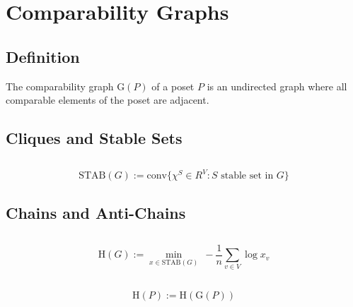 \section{Comparability Graphs}
\subsection{Definition}

The comparability graph $\text{G}(P)$ of a poset $P$ is an undirected graph where all comparable elements of the poset are adjacent.

\subsection{Cliques and Stable Sets}



\subsection{}
\begin{equation}
\text{STAB}(G) := \text{conv}\{\chi^S \in R^V : S\text{ stable set in }G\}
\label{eq:stab}
\end{equation}

\subsection{Chains and Anti-Chains}

\subsection{}
\begin{equation}
\text{H}(G) := \min_{x \in \text{STAB}(G)}~ -\frac{1}{n} \sum_{v \in V} \log x_v
\label{eq:entropy:graph}
\end{equation}

\subsection{}
\begin{equation}
\text{H}(P) := \text{H}(\text{G}(P))
\label{eq:entropy:poset}
\end{equation}

